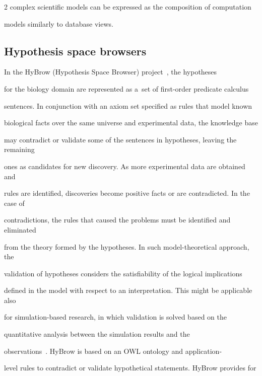 \begin{multicols}{2}
complex scientific models can be expressed as the composition of computation


models similarly to database views.


{





}





\subsection{Hypothesis space browsers}





  \noindent


  In the HyBrow (Hypothesis Space Browser) project~\cite{44-kl}, the hypotheses


for the biology domain are represented as a~set of first-order predicate calculus


sentences. In conjunction with an axiom set specified as rules that model known


biological facts over the same universe and experimental data, the knowledge base


may contradict or validate some of the sentences in hypotheses, leaving the remaining


ones as candidates for new discovery. As more experimental data are obtained and


rules are identified, discoveries become positive facts or are contradicted. In the case of


contradictions, the rules that caused the problems must be identified and eliminated


from the theory formed by the hypotheses. In such model-theoretical approach, the


validation of hypotheses considers the satisfiability of the logical implications


defined in the model with respect to an interpretation. This might be applicable also


for simulation-based research, in which validation is solved based on the


quantitative analysis between the simulation results and the


  observations~\cite{43-kl}. HyBrow is based on an OWL ontology and application-


level rules to contradict or validate hypothetical statements. HyBrow provides for



\end{multicols}
